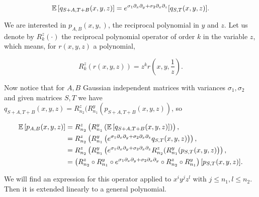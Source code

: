         \begin{equation*}
            \mathbb E \left[ q_{S+A,T+B}(x,y,z) \right] = e^{\sigma_1 \partial_x \partial_y + \sigma_2 \partial_x \partial_z}[q_{S,T}(x,y,z)].
        \end{equation*}
        
        
        
        We are interested in $p_{A,B}(x,y,)$, the reciprocal polynomial in $y$ and $z$.  Let us denote by $R^z_{k}(\cdot)$ the reciprocal polynomial operator of order $k$ in the variable $z$, which means, for $r(x,y,z)$ a polynomial,

        \begin{equation*}
            R^z_k \left(r(x,y,z)\right) = z^kr\left(x,y,\frac1z\right).
        \end{equation*}

        Now notice that for $A,B$ Gaussian independent matrices with variances $\sigma_1,\sigma_2$ and given matrices $S,T$ we have $q_{S+A,T+B}(x,y,z)= R^z_{n_2}(R^y_{n_1}(p_{S+A,T+B}(x,y,z))$, so

        \begin{align*}
            \mathbb E \left[ p_{A,B}(x,y,z) \right] &= R^z_{n_2}\left( R^y_{n_1}\left(\mathbb E \left[  q_{S+A,T+B}(x,y,z)  \right] \right) \right), \\
            &= R^z_{n_2}\left( R^y_{n_1}\left(e^{\sigma_1 \partial_x\partial_y + \sigma_2 \partial_x\partial_z} q_{S,T}(x,y,z) \right) \right), \\
            &= R^z_{n_2}\left( R^y_{n_1}\left(e^{\sigma_1 \partial_x\partial_y + \sigma_2 \partial_x\partial_z} R^z_{n_2}(R^y_{n_1}(p_{S,T}(x,y,z) \right) \right),\\ 
            &= \left( R^z_{n_2}\circ R^{y}_{n_1}\circ e^{\sigma_1\partial_x\partial_y + \sigma_2 \partial_x\partial_y} \circ R^z_{n_2}\circ R^{y}_{n_1} \right)[p_{S,T}(x,y,z)].
        \end{align*}

    We will find an expression for this operator applied to $x^iy^jz^l$ with $j\le n_1, l \le n_2$. Then it is extended linearly to a general polynomial.

